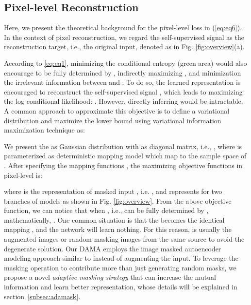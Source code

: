 \documentclass[10pt,twocolumn,letterpaper]{article}
\begin{document}
\subsection{Pixel-level Reconstruction}\label{subsec:pixel}
Here, we present the theoretical background for the pixel-level loss  in (\ref{eq:eq6}). In the context of pixel reconstruction, we regard the self-supervised signal  as the reconstruction target, i.e., the original input, denoted as  in Fig. \ref{fig:overview}(a).

According to \eqref{eq:eq1}, minimizing the conditional entropy  (green area) would also encourage  to be fully determined by , indirectly maximizing , and minimization the irrelevant information between  and  \cite{twins,morency}. To do so, the learned representation  is encouraged to reconstruct the self-supervised signal , which leads to maximizing the log conditional likelihood: . However, directly inferring  would be intractable. A common approach to approximate this objective is to define a variational distribution  and maximize the lower bound  using variational information maximization technique \cite{varim} as:

We present the  as Gaussian distribution with  as diagonal matrix, i.e.,  \cite{gan,morency,completer}, where  is parameterized as deterministic mapping model which map  to the sample space of . After specifying the mapping functions , the maximizing  objective functions in pixel-level is:

where  is the representation of masked input , i.e. , and  represents for two branches of models as shown in Fig. \ref{fig:overview}. From the above objective function, we can notice that when , i.e.,  can be fully determined by , mathematically, . One common situation is that the  becomes the identical mapping , and the network will learn nothing. For this reason,  is usually the augmented images or random masking images from the same source to avoid the degenerate solution. Our DAMA employs the image masked autoencoder modeling approach similar to \cite{mae,beit,simmim,data2vec} instead of augmenting the input. To leverage the masking operation to contribute more than just generating random masks, we propose a novel \textit{adaptive masking strategy} that can increase the mutual information  and learn better representation, whose details will be explained in section~\ref{subsec:adamask}.
\end{document}
